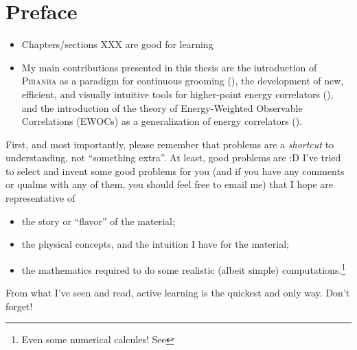 \section*{Preface}



\begin{itemize}
    \item
        Chapters/sections XXX are good for learning


    \item
        My main contributions presented in this thesis are the introduction of \textsc{Piranha} as a paradigm for continuous grooming (\Secs{}{}), the development of new, efficient, and visually intuitive tools for higher-point energy correlators (\Sec{}), and the introduction of the theory of Energy-Weighted Observable Correlations (EWOCs) as a generalization of energy correlators (\Sec{}).
\end{itemize}




First, and most importantly, please remember that problems are a \textit{shortcut} to understanding, not ``something extra''.
%
At least, good problems are :D
%
I've tried to select and invent some good problems for you (and if you have any comments or qualms with any of them, you should feel free to email me) that I hope are representative of
\begin{itemize}
    \item
        the story or ``flavor'' of the material;

    \item
        the physical concepts, and the intuition I have for the material;

    \item
        the mathematics required to do some realistic (albeit simple) computations.\footnote{Even some numerical calcules! See \Sec{}}
\end{itemize}
%
From what I've seen and read, active learning is the quickest and only way.
%
Don't forget!
